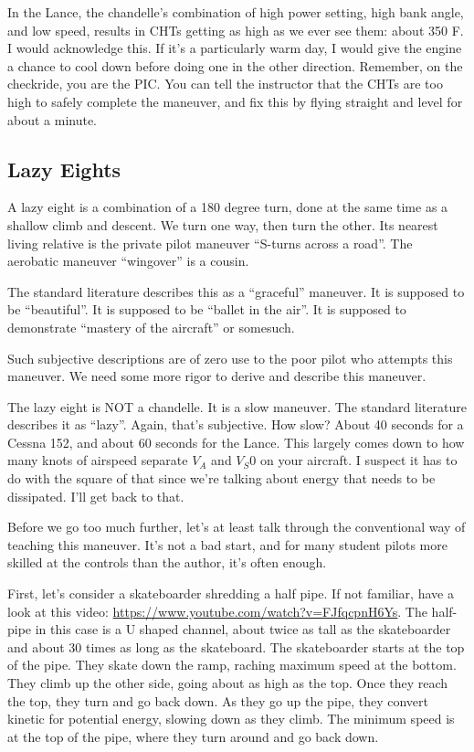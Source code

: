 In the Lance, the chandelle's combination of high power setting, high bank angle, and low speed, results in CHTs getting as high as we ever see them: about 350 F. I would acknowledge this. If it's a particularly warm day, I would give the engine a chance to cool down before doing one in the other direction. Remember, on the checkride, you are the PIC. You can tell the instructor that the CHTs are too high to safely complete the maneuver, and fix this by flying straight and level for about a minute.

\subsection{Lazy Eights}

A lazy eight is a combination of a 180 degree turn, done at the same time as a shallow climb and descent. We turn one way, then turn the other. Its nearest living relative is the private pilot maneuver ``S-turns across a road''. The aerobatic maneuver ``wingover'' is a cousin.

The standard literature describes this as a ``graceful'' maneuver. It is supposed to be ``beautiful''. It is supposed to be ``ballet in the air''. It is supposed to demonstrate ``mastery of the aircraft'' or somesuch.

Such subjective descriptions are of zero use to the poor pilot who attempts this maneuver. We need some more rigor to derive and describe this maneuver.

The lazy eight is NOT a chandelle. It is a slow maneuver. The standard literature describes it as ``lazy''. Again, that's subjective. How slow? About 40 seconds for a Cessna 152, and about 60 seconds for the Lance. This largely comes down to how many knots of airspeed separate $V_A$ and $V_S0$ on your aircraft. I suspect it has to do with the square of that since we're talking about energy that needs to be dissipated. I'll get back to that.

Before we go too much further, let's at least talk through the conventional way of teaching this maneuver. It's not a bad start, and for many student pilots more skilled at the controls than the author, it's often enough.

First, let's consider a skateboarder shredding a half pipe. If not familiar, have a look at this video: \url{https://www.youtube.com/watch?v=FJfqcpnH6Ys}. The half-pipe in this case is a U shaped channel, about twice as tall as the skateboarder and about 30 times as long as the skateboard. The skateboarder starts at the top of the pipe. They skate down the ramp, raching maximum speed at the bottom. They climb up the other side, going about as high as the top. Once they reach the top, they turn and go back down. As they go up the pipe, they convert kinetic for potential energy, slowing down as they climb. The minimum speed is at the top of the pipe, where they turn around and go back down.

